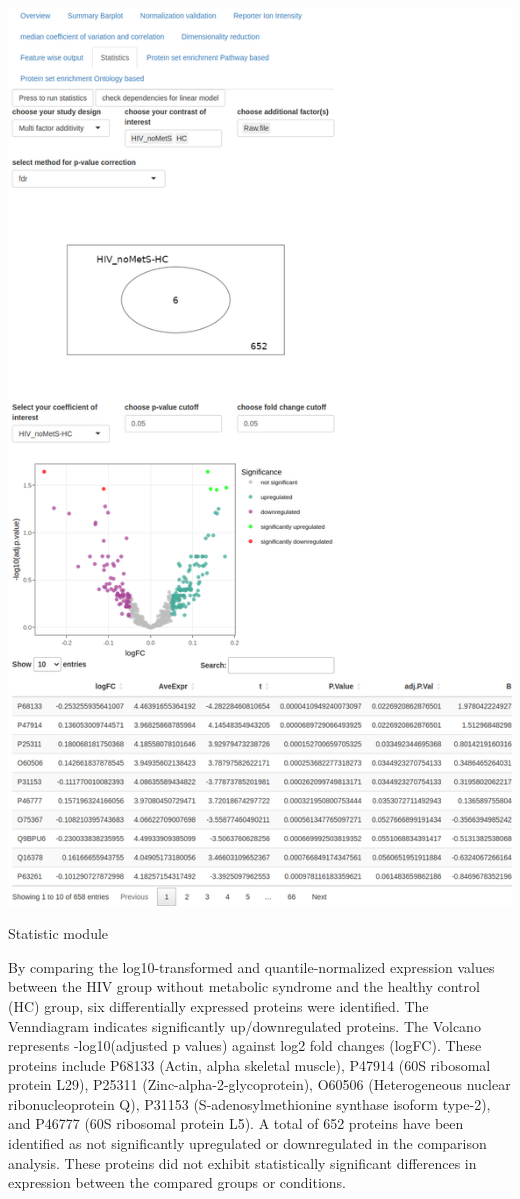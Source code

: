\documentclass[
  11pt,
]{article}
\let\origfigure\figure
\begin{document}
\newpage
\bgroup  \origfigure[H] 

{\centering \includegraphics[width=0.7\linewidth]{screenshots/stat_HC_HIV_noMets} 

}

\caption{Statistic module}\label{fig:ui_stat_HC_HIV_noMets}
 \endfigure\egroup

\newpage

By comparing the log10-transformed and quantile-normalized expression
values between the HIV group without metabolic syndrome and the healthy
control (HC) group, six differentially expressed proteins were
identified. The Venndiagram indicates significantly up/downregulated
proteins. The Volcano represents -log10(adjusted p values) against log2
fold changes (logFC). These proteins include P68133 (Actin, alpha
skeletal muscle), P47914 (60S ribosomal protein L29), P25311
(Zinc-alpha-2-glycoprotein), O60506 (Heterogeneous nuclear
ribonucleoprotein Q), P31153 (S-adenosylmethionine synthase isoform
type-2), and P46777 (60S ribosomal protein L5). A total of 652 proteins
have been identified as not significantly upregulated or downregulated
in the comparison analysis. These proteins did not exhibit statistically
significant differences in expression between the compared groups or
conditions.
\end{document}
